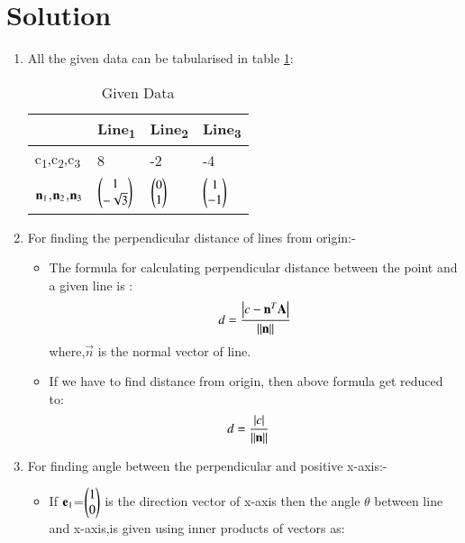 \documentclass[journal,12pt,twocolumn]{IEEEtran}
\begin{document}
\section{Solution}
\begin{enumerate}
\item  All the given data can be tabularised in table \ref{tab:table1}:
\begin{table}[!ht]
\begin{center}
\begin{tabular}{ | m{2cm} | m{1.2cm}| m{1.2cm} | m{1.2cm} |} 
\hline
 & Line\textsubscript{1} & Line\textsubscript{2} & Line\textsubscript{3} \\
\hline
c\textsubscript{1},c\textsubscript{2},c\textsubscript{3} & 8 & -2 & -4 \\ 
\hline
$\vec{n\textsubscript{1}}$,$\vec{n\textsubscript{2}}$,$\vec{n\textsubscript{3}}$ & $\myvec{1\\-\sqrt{3}}$ & $\myvec{0\\1}$ &$\myvec{1\\-1}$ \\ 
\hline
\end{tabular}
\end{center}
\caption{Given Data}
\label{tab:table1}
\end{table}
\item For finding the perpendicular distance of lines from origin:-
\begin{itemize}
\item The formula for calculating perpendicular distance between the point and a given line is :
\begin{align}
d=\frac { \left| c-\vec{n}^T\vec{A} \right| }{ \norm{\vec{n}} }
\end{align}
where,$\vec{n}$ is the normal vector of line.
\item If we have to find distance from origin, then above formula get reduced to:
\begin{align}
d&=\frac { \left| c \right| }{\norm{\vec{n}}}\label{eqA}
\end{align}
\end{itemize}
\item For finding angle between the perpendicular and positive x-axis:-
\begin{itemize}
\item If $\vec{e\textsubscript{1}}$=$\myvec{1\\0}$ is the direction vector of x-axis then the angle $\theta$  between line and x-axis,is given using inner products of vectors as:

\end{itemize}
\end{enumerate}
\end{document}
